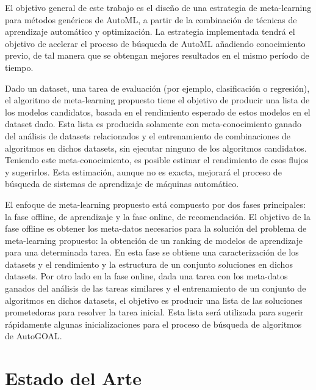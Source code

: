 \documentclass[a4paper,12pt]{article}
\begin{document}
El objetivo general de este trabajo es el diseño de una estrategia de meta-learning para métodos genéricos de AutoML, a partir de la combinación de técnicas de aprendizaje automático y optimización. La estrategia implementada tendrá el objetivo de acelerar el proceso de búsqueda de AutoML añadiendo conocimiento previo, de tal manera que se obtengan mejores resultados en el mismo período de tiempo.

 Dado un dataset, una tarea de evaluación (por ejemplo, clasificación o regresión), el algoritmo de meta-learning propuesto tiene el objetivo de producir una lista de los modelos candidatos, basada en el rendimiento esperado de estos modelos en el dataset dado. Esta lista es producida solamente con meta-conocimiento ganado del análisis de datasets relacionados y el entrenamiento de combinaciones de algoritmos en dichos datasets, sin ejecutar ninguno de los algoritmos candidatos. Teniendo este meta-conocimiento, es posible estimar el rendimiento de esos flujos y sugerirlos. Esta estimación, aunque no es exacta, mejorará el proceso de búsqueda de sistemas de aprendizaje de máquinas automático.

 El enfoque de meta-learning propuesto está compuesto por dos fases principales: la fase offline, de aprendizaje y la fase online, de recomendación. El objetivo de la fase offline es obtener los meta-datos necesarios para la solución del problema de meta-learning propuesto: la obtención de un ranking de modelos de aprendizaje para una determinada tarea. En esta fase se obtiene una caracterización de los datasets y el rendimiento y la estructura de un conjunto soluciones en dichos datasets. Por otro lado en la fase online, dada una tarea con los meta-datos ganados del análisis de las tareas similares y el entrenamiento de un conjunto de algoritmos en dichos datasets, el objetivo es producir una lista de las soluciones prometedoras para resolver la tarea inicial. Esta lista será utilizada para sugerir rápidamente algunas inicializaciones para el proceso de búsqueda de algoritmos de AutoGOAL.




\section{Estado del Arte}\label{sec:review}
\end{document}
